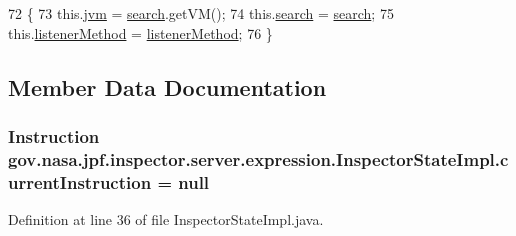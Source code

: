 \begin{DoxyCode}
72                                                                           \{
73     this.\hyperlink{classgov_1_1nasa_1_1jpf_1_1inspector_1_1server_1_1expression_1_1_inspector_state_impl_a0c9ed60abbbcc0a956d2902347770dda}{jvm} = \hyperlink{classgov_1_1nasa_1_1jpf_1_1inspector_1_1server_1_1expression_1_1_inspector_state_impl_aad68b55c445091d252a965081641b48f}{search}.getVM();
74     this.\hyperlink{classgov_1_1nasa_1_1jpf_1_1inspector_1_1server_1_1expression_1_1_inspector_state_impl_aad68b55c445091d252a965081641b48f}{search} = \hyperlink{classgov_1_1nasa_1_1jpf_1_1inspector_1_1server_1_1expression_1_1_inspector_state_impl_aad68b55c445091d252a965081641b48f}{search};
75     this.\hyperlink{classgov_1_1nasa_1_1jpf_1_1inspector_1_1server_1_1expression_1_1_inspector_state_impl_a6cc5f61624118469f3c43361c867f439}{listenerMethod} = \hyperlink{classgov_1_1nasa_1_1jpf_1_1inspector_1_1server_1_1expression_1_1_inspector_state_impl_a6cc5f61624118469f3c43361c867f439}{listenerMethod};
76   \}
\end{DoxyCode}


\subsection{Member Data Documentation}
\subsubsection[{\texorpdfstring{current\+Instruction}{currentInstruction}}]{\setlength{\rightskip}{0pt plus 5cm}Instruction gov.\+nasa.\+jpf.\+inspector.\+server.\+expression.\+Inspector\+State\+Impl.\+current\+Instruction = null\hspace{0.3cm}{\ttfamily [private]}}\hypertarget{classgov_1_1nasa_1_1jpf_1_1inspector_1_1server_1_1expression_1_1_inspector_state_impl_a7399cb79ee39368da7fb3440e586d52f}{}\label{classgov_1_1nasa_1_1jpf_1_1inspector_1_1server_1_1expression_1_1_inspector_state_impl_a7399cb79ee39368da7fb3440e586d52f}


Definition at line 36 of file Inspector\+State\+Impl.\+java.


